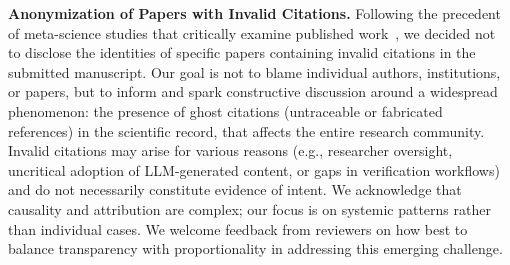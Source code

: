 \noindent\textbf{Anonymization of Papers with Invalid Citations.}
Following the precedent of meta-science studies that critically examine published work~\cite{schloegel2025confusing}, we decided not to disclose the identities of specific papers containing invalid citations in the submitted manuscript.
Our goal is not to blame individual authors, institutions, or papers, but to inform and spark constructive discussion around a widespread phenomenon: the presence of ghost citations (untraceable or fabricated references) in the scientific record, that affects the entire research community.
Invalid citations may arise for various reasons (e.g., researcher oversight, uncritical adoption of LLM-generated content, or gaps in verification workflows) and do not necessarily constitute evidence of intent.
We acknowledge that causality and attribution are complex; our focus is on systemic patterns rather than individual cases.
We welcome feedback from reviewers on how best to balance transparency with proportionality in addressing this emerging challenge.

